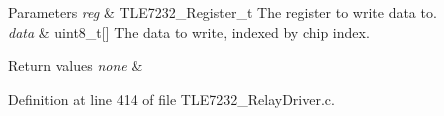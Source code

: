 \begin{DoxyParams}{Parameters}
{\em reg} & T\-L\-E7232\-\_\-\-Register\-\_\-t The register to write data to. \\
\hline
{\em data} & uint8\-\_\-t\mbox{[}\mbox{]} The data to write, indexed by chip index. \\
\hline
\end{DoxyParams}

\begin{DoxyRetVals}{Return values}
{\em none} & \\
\hline
\end{DoxyRetVals}


Definition at line 414 of file T\-L\-E7232\-\_\-\-Relay\-Driver.\-c.


